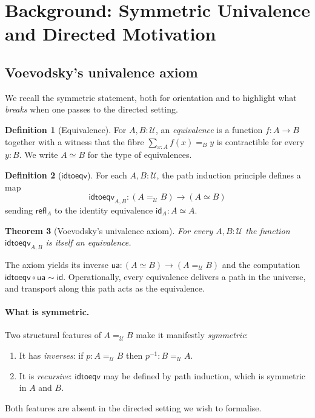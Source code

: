 \documentclass[12pt]{article}
\newtheorem{theorem}{Theorem}[section]
\theoremstyle{definition}
\newtheorem{definition}[theorem]{Definition}
\theoremstyle{remark}
\newcommand{\U}{\mathcal{U}}
\newcommand{\id}{\mathsf{id}}
\newcommand{\refl}{\mathsf{refl}}
\newcommand{\ua}{\mathsf{ua}}
\newcommand{\idtoeqv}{\mathsf{idtoeqv}}
\newcommand{\eqv}{\simeq}
\newcommand{\inv}{^{-1}}
\begin{document}
\section{Background: Symmetric Univalence and Directed Motivation}\label{sec:background}

\subsection{Voevodsky's univalence axiom}

We recall the symmetric statement, both for orientation and to highlight what \emph{breaks} when one passes to the directed setting.

\begin{definition}[Equivalence]\label{def:equiv}
For $A, B : \U$, an \emph{equivalence} is a function $f : A \to B$ together with a witness that the fibre $\sum_{x : A} f(x) =_B y$ is contractible for every $y : B$. We write $A \eqv B$ for the type of equivalences.
\end{definition}

\begin{definition}[$\idtoeqv$]\label{def:idtoeqv}
For each $A, B : \U$, the path induction principle defines a map
\[
\idtoeqv_{A,B} : (A =_{\U} B) \to (A \eqv B)
\]
sending $\refl_A$ to the identity equivalence $\id_A : A \eqv A$.
\end{definition}

\begin{theorem}[Voevodsky's univalence axiom]\label{thm:univalence}
For every $A, B : \U$ the function $\idtoeqv_{A,B}$ is itself an equivalence.
\end{theorem}

The axiom yields its inverse $\ua : (A \eqv B) \to (A =_{\U} B)$ and the computation $\idtoeqv \circ \ua \sim \id$. Operationally, every equivalence delivers a path in the universe, and transport along this path acts as the equivalence.

\paragraph{What is symmetric.}
Two structural features of $A =_{\U} B$ make it manifestly \emph{symmetric}:
\begin{enumerate}
\item It has \emph{inverses}: if $p : A =_{\U} B$ then $p\inv : B =_{\U} A$.
\item It is \emph{recursive}: $\idtoeqv$ may be defined by path induction, which is symmetric in $A$ and $B$.
\end{enumerate}
Both features are absent in the directed setting we wish to formalise.
\end{document}
